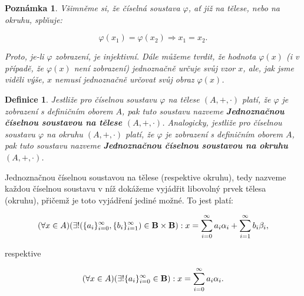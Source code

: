 \documentclass[12pt]{book}
\newtheorem{definice}{Definice}
\newtheorem{pozn}{Pozn\' amka}
\begin{document}
\begin{pozn}
Všimněme si, že číselná soustava $\varphi$, ať již na tělese, nebo na okruhu, splňuje:

$$\varphi (x_1) = \varphi(x_2) \Rightarrow x_1 = x_2.$$

Proto, je-li $\varphi$ zobrazení, je injektivní.
Dále můžeme tvrdit, že hodnota $\varphi(x)$ (i v případě, že $\varphi(x)$ není zobrazení) jednoznačně určuje svůj vzor $x$, ale, jak jsme viděli výše, $x$ nemusí jednoznačně určovat svůj obraz $\varphi(x)$.

\end{pozn}


	\begin{definice}
		Jestliže pro číselnou soustavu $\varphi$ na tělese $(A,+,\cdot)$ platí, že $\varphi$ je zobrazení s definičním oborem $A$, pak tuto soustavu nazveme \textbf{Jednoznačnou číselnou soustavou na tělese $(A,+,\cdot)$}. Analogicky, jestliže pro číselnou soustavu $\varphi$ na okruhu $(A,+,\cdot)$ platí, že $\varphi$ je zobrazení s definičním oborem $A$, pak tuto soustavu nazveme \textbf{Jednoznačnou číselnou soustavou na okruhu $(A,+,\cdot)$}.
	\end{definice}

Jednoznačnou číselnou soustavou na tělese (respektive okruhu), tedy nazveme každou číselnou soustavu v níž dokážeme vyjádřit libovolný prvek tělesa (okruhu), přičemž je toto vyjádření jediné možné. To jest platí:	

$$(\forall x \in A) (\exists!(\{a_i\}_{i=0}^{\infty},\{b_i\}_{i=1}^{\infty})\in\textbf{B}\times\textbf{B}): x = \sum_{i=0}^{\infty} a_{i}\alpha_{i} + \sum_{i=1}^{\infty} b_{i}\beta_{i},$$

respektive

$$(\forall x \in A) (\exists! \{a_i\}_{i=0}^{\infty} \in \textbf{B}): x = \sum_{i=0}^{\infty} a_{i}\alpha_{i}.$$
\end{document}
